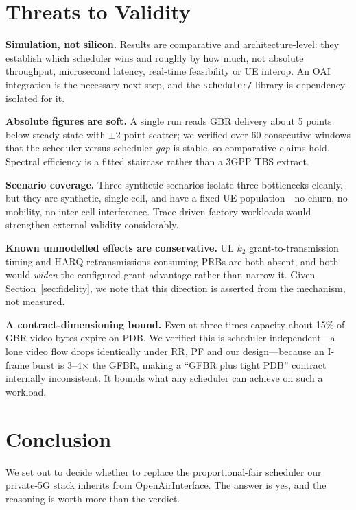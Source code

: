 \documentclass[conference]{IEEEtran}
\begin{document}
\section{Threats to Validity}\label{sec:threats}

\textbf{Simulation, not silicon.} Results are comparative and
architecture-level: they establish which scheduler wins and roughly by how
much, not absolute throughput, microsecond latency, real-time feasibility or
UE interop. An OAI integration is the necessary next step, and the
\texttt{scheduler/} library is dependency-isolated for it.

\textbf{Absolute figures are soft.} A single run reads GBR delivery about 5
points below steady state with $\pm$2 point scatter; we verified over 60
consecutive windows that the scheduler-versus-scheduler \emph{gap} is
stable, so comparative claims hold. Spectral efficiency is a fitted
staircase rather than a 3GPP TBS extract.

\textbf{Scenario coverage.} Three synthetic scenarios isolate three
bottlenecks cleanly, but they are synthetic, single-cell, and have a fixed UE
population---no churn, no mobility, no inter-cell interference. Trace-driven
factory workloads would strengthen external validity considerably.

\textbf{Known unmodelled effects are conservative.} UL $k_2$
grant-to-transmission timing and HARQ retransmissions consuming PRBs are both
absent, and both would \emph{widen} the configured-grant advantage rather
than narrow it. Given Section~\ref{sec:fidelity}, we note that this
direction is asserted from the mechanism, not measured.

\textbf{A contract-dimensioning bound.} Even at three times capacity about
15\% of GBR video bytes expire on PDB. We verified this is
scheduler-independent---a lone video flow drops identically under RR, PF and
our design---because an I-frame burst is 3--4$\times$ the GFBR, making a
``GFBR plus tight PDB'' contract internally inconsistent. It bounds what any
scheduler can achieve on such a workload.

\section{Conclusion}

We set out to decide whether to replace the proportional-fair scheduler our
private-5G stack inherits from OpenAirInterface. The answer is yes, and the
reasoning is worth more than the verdict.
\end{document}
